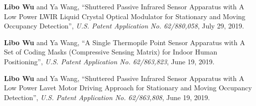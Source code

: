

\begin{cvparagraph}


\vspace{12pt}
\begin{cvitems}
      \setlength{\itemsep}{2pt}
      \item \textbf{Libo Wu} and Ya Wang, ``Shuttered Passive Infrared Sensor Apparatus with A Low Power LWIR Liquid Crystal Optical Modulator for Stationary and Moving Occupancy Detection'', \textit{U.S. Patent Application No. 62/880,058}, July 29, 2019.

	\item \textbf{Libo Wu} and Ya Wang, ``A Single Thermopile Point Sensor Apparatus with A Set of Coding Masks (Compressive Sensing Matrix) for Indoor Human Positioning'', \textit{U.S. Patent Application No. 62/863,823}, June 19, 2019.
		
	\item \textbf{Libo Wu} and Ya Wang, ``Shuttered Passive Infrared Sensor Apparatus with A Low Power Lavet Motor Driving Approach for Stationary and Moving Occupancy Detection'', \textit{U.S. Patent Application No. 62/863,808}, June 19, 2019.   
\end{cvitems}
    
\end{cvparagraph}

